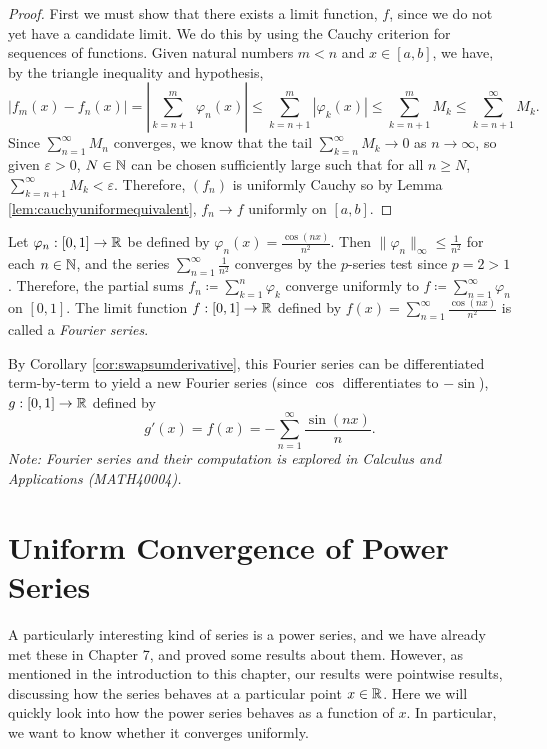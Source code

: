 \documentclass[../analysis1.tex]{subfiles}
\begin{document}
\begin{proof}
    First we must show that there exists a limit function, $f$, since we do not yet have a candidate limit. We do this by using the Cauchy criterion for sequences of functions. Given natural numbers $m<n$ and $x\in[a,b]$, we have, by the triangle inequality and hypothesis,
    \[|f_m(x)-f_n(x)|=\left|\sum_{k=n+1}^m \varphi_n(x)\right|\le \sum_{k=n+1}^m |\varphi_k(x)|\le \sum_{k=n+1}^m M_k\le \sum_{k=n+1}^{\infty} M_k.\]
    Since $\sum_{n=1}^{\infty}M_n$ converges, we know that the tail $\sum_{k=n}^{\infty} M_k\to 0$ as $n\to\infty$, so given $\varepsilon>0$, $N\in\mathbb{N}$ can be chosen sufficiently large such that for all $n\ge N$, $\sum_{k=n+1}^{\infty}M_k<\varepsilon$. Therefore, $(f_n)$ is uniformly Cauchy so by Lemma \ref{lem:cauchyuniformequivalent}, $f_n\to f$ uniformly on $[a,b]$.
\end{proof}
\begin{example}
    Let $\varphi_n:[0,1]\to\mathbb{R}$ be defined by $\varphi_n(x)=\frac{\cos(nx)}{n^2}.$ Then $\|\varphi_n\|_\infty \le \frac{1}{n^2}$ for each $n\in\mathbb{N}$, and the series $\sum_{n=1}^{\infty}\frac{1}{n^2}$ converges by the $p$-series test since $p=2>1$. Therefore, the partial sums $f_n\coloneqq \sum_{k=1}^n \varphi_k$ converge uniformly to $f\coloneqq \sum_{n=1}^{\infty}\varphi_n$ on $[0,1]$. The limit function $f:[0,1]\to\mathbb{R}$ defined by $f(x)=\sum_{n=1}^{\infty}\frac{\cos(nx)}{n^2}$ is called a \textit{Fourier series}. 

    By Corollary \ref{cor:swapsumderivative}, this Fourier series can be differentiated term-by-term to yield a new Fourier series (since $\cos $ differentiates to $-\sin $), $g:[0,1]\to\mathbb{R}$ defined by
    \[g'(x)=f(x)=-\sum_{n=1}^{\infty}\frac{\sin (nx)}{n}.\]
    \textit{Note: Fourier series and their computation is explored in Calculus and Applications (MATH40004).}
\end{example}

\section{Uniform Convergence of Power Series}

A particularly interesting kind of series is a power series, and we have already met
these in Chapter 7, and proved some results about them. However, as mentioned in the introduction to this chapter, our results were pointwise results, discussing how the series behaves at a particular point $x\in \mathbb{R}$.
Here we will quickly look into how the power series behaves as a function of $x$. In particular, we want to know whether it converges uniformly.
\end{document}
